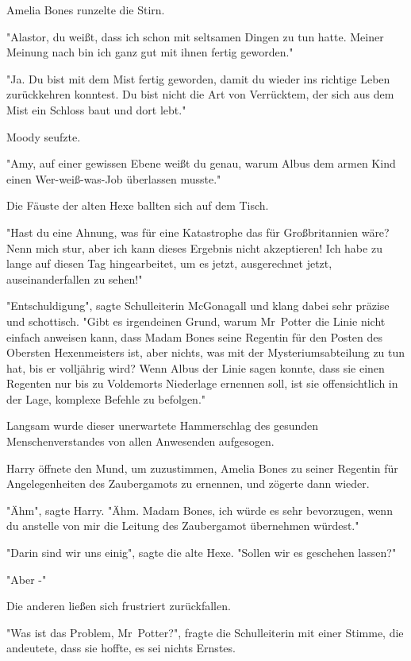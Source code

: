 {Amelia Bones runzelte die Stirn.

"Alastor, du weißt, dass ich schon mit seltsamen Dingen zu tun hatte. Meiner Meinung nach bin ich ganz gut mit ihnen fertig geworden."

"Ja. Du bist mit dem Mist fertig geworden, damit du wieder ins richtige Leben zurückkehren konntest. Du bist nicht die Art von Verrücktem, der sich aus dem Mist ein Schloss baut und dort lebt."

Moody seufzte.

"Amy, auf einer gewissen Ebene weißt du genau, warum Albus dem armen Kind einen Wer-weiß-was-Job überlassen musste."

Die Fäuste der alten Hexe ballten sich auf dem Tisch.

"Hast du eine Ahnung, was für eine Katastrophe das für Großbritannien wäre? Nenn mich stur, aber ich kann dieses Ergebnis nicht akzeptieren! Ich habe zu lange auf diesen Tag hingearbeitet, um es jetzt, ausgerechnet jetzt, auseinanderfallen zu sehen!"

"Entschuldigung", sagte Schulleiterin McGonagall und klang dabei sehr präzise und schottisch. "Gibt es irgendeinen Grund, warum Mr~Potter die Linie nicht einfach anweisen kann, dass Madam Bones seine Regentin für den Posten des Obersten Hexenmeisters ist, aber nichts, was mit der Mysteriumsabteilung zu tun hat, bis er volljährig wird? Wenn Albus der Linie sagen konnte, dass sie einen Regenten nur bis zu Voldemorts Niederlage ernennen soll, ist sie offensichtlich in der Lage, komplexe Befehle zu befolgen."

Langsam wurde dieser unerwartete Hammerschlag des gesunden Menschenverstandes von allen Anwesenden aufgesogen.

Harry öffnete den Mund, um zuzustimmen, Amelia Bones zu seiner Regentin für Angelegenheiten des Zaubergamots zu ernennen, und zögerte dann wieder.

"Ähm", sagte Harry. "Ähm. Madam Bones, ich würde es sehr bevorzugen, wenn du anstelle von mir die Leitung des Zaubergamot übernehmen würdest."

"Darin sind wir uns einig", sagte die alte Hexe. "Sollen wir es geschehen lassen?"

"Aber -"

Die anderen ließen sich frustriert zurückfallen.

"Was ist das Problem, Mr~Potter?", fragte die Schulleiterin mit einer Stimme, die andeutete, dass sie hoffte, es sei nichts Ernstes.

}
